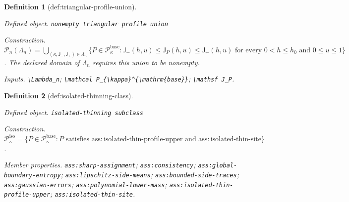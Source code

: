 \documentclass{article}
\newtheorem{definition}{Definition}
\begin{document}
\begin{definition}[def:triangular-profile-union]\label{def:triangular-profile-union}
\par\smallskip\noindent\emph{Defined object.} \texttt{nonempty triangular profile union}
\par\smallskip\noindent\emph{Construction.} \(\mathcal P_n(\Lambda_n)=\bigcup_{(\kappa,\mathsf J_{-},\mathsf J_{+})\in\Lambda_n}\{P\in\mathcal P_{\kappa}^{\mathrm{base}}:\mathsf J_{-}(h,u)\le\mathsf J_P(h,u)\le\mathsf J_{+}(h,u)\text{ for every }0<h\le h_0\text{ and }0\le u\le1\}\). The declared domain of \(\Lambda_n\) requires this union to be nonempty.
\par\smallskip\noindent\emph{Inputs.} \texttt{\textbackslash{}\allowbreak{}Lambda\_\allowbreak{}n}; \texttt{\textbackslash{}\allowbreak{}mathcal P\_\allowbreak{}\{\textbackslash{}\allowbreak{}kappa\}\allowbreak{}\textasciicircum{}\{\textbackslash{}\allowbreak{}mathrm\{base\}\allowbreak{}\}\allowbreak{}}; \texttt{\textbackslash{}\allowbreak{}mathsf J\_\allowbreak{}P}.
\end{definition}

\begin{definition}[def:isolated-thinning-class]\label{def:isolated-thinning-class}
\par\smallskip\noindent\emph{Defined object.} \texttt{isolated-\allowbreak{}thinning subclass}
\par\smallskip\noindent\emph{Construction.} \(\mathcal P_{\kappa}^{\mathrm{iso}}=\{P\in\mathcal P_{\kappa}^{\mathrm{base}}:P\text{ satisfies }\mathrm{ass:isolated\text{-}thin\text{-}profile\text{-}upper}\text{ and }\mathrm{ass:isolated\text{-}thin\text{-}site}\}\).
\par\smallskip\noindent\emph{Member properties.} \texttt{ass:\allowbreak{}sharp-\allowbreak{}assignment}; \texttt{ass:\allowbreak{}consistency}; \texttt{ass:\allowbreak{}global-\allowbreak{}boundary-\allowbreak{}entropy}; \texttt{ass:\allowbreak{}lipschitz-\allowbreak{}side-\allowbreak{}means}; \texttt{ass:\allowbreak{}bounded-\allowbreak{}side-\allowbreak{}traces}; \texttt{ass:\allowbreak{}gaussian-\allowbreak{}errors}; \texttt{ass:\allowbreak{}polynomial-\allowbreak{}lower-\allowbreak{}mass}; \texttt{ass:\allowbreak{}isolated-\allowbreak{}thin-\allowbreak{}profile-\allowbreak{}upper}; \texttt{ass:\allowbreak{}isolated-\allowbreak{}thin-\allowbreak{}site}.
\end{definition}
\end{document}

